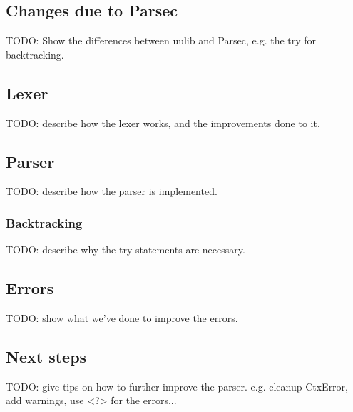 \subsection{Changes due to Parsec}
TODO: Show the differences between uulib and Parsec, e.g. the try for backtracking.

\subsection{Lexer}
\label{subsec:lexer}
TODO: describe how the lexer works, and the improvements done to it.

\subsection{Parser}
\label{subsec:parser}
TODO: describe how the parser is implemented.

\subsubsection{Backtracking}
TODO: describe why the try-statements are necessary.

\subsection{Errors}
TODO: show what we've done to improve the errors.

\subsection{Next steps}
TODO: give tips on how to further improve the parser. e.g. cleanup CtxError, add warnings, use <?> for the errors...